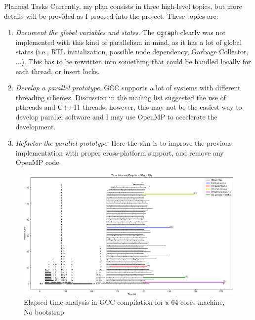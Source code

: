 \documentclass[12pt]{article}
\begin{document}
\begin{subsection}{Planned Tasks}
    Currently, my plan consists in three high-level topics, but more details
will be provided as I proceed into the project. These topics are:

\begin{enumerate}
    \item \textit{Document the global variables and states}. The \texttt{cgraph}
clearly was not implemented with this kind of parallelism in mind, as it has a lot
of global states (i.e., RTL initialization, possible node dependency,
Garbage Collector, ...). This has to be rewritten into something that could
be handled locally for each thread, or insert locks.
	\item \textit{Develop a parallel prototype}. GCC supports a lot of systems
with different threading schemes. Discussion in the mailing list suggested the
use of pthreads and C++11 threads, however, this may not be the easiest way to
develop parallel software and I may use OpenMP to accelerate the development.
	\item \textit{Refactor the parallel prototype}. Here the aim is to improve
the previous implementation with proper cross-platform support, and remove any
OpenMP code.
\end{enumerate}


\begin{figure}[ht]
 \centering
 \includegraphics[scale=0.6, angle=-90]{out-crop.pdf}
 \caption{Elapsed time analysis in GCC compilation for a 64 cores machine, No bootstrap}
 \label{fig:analysis}
\end{figure}

\end{subsection}
\end{document}

